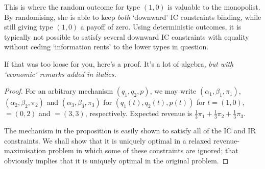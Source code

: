 This is where the random outcome for type $(1,0)$ is valuable to the monopolist.
By randomising, she is able to keep \emph{both} `downward' IC constraints binding, while still giving type $(1,0)$ a payoff of zero.
Using deterministic outcomes, it is typically not possible to satisfy several downward IC constraints with equality without ceding `information rents' to the lower types in question.

If that was too loose for you, here's a proof.
It's a lot of algebra, \emph{but with `economic' remarks added in italics.}

\begin{proof}
	For an arbitrary mechanism $(q_1,q_2,p)$,
	we may write
	$(\alpha_1,\beta_1,\pi_1)$, $(\alpha_2,\beta_2,\pi_2)$ and $(\alpha_3,\beta_3,\pi_3)$ for $( q_1(t), q_2(t), p(t) )$
	for $t = (1,0)$, $=(0,2)$ and $=(3,3)$, respectively.
	Expected revenue is $\frac{1}{3}\pi_1 + \frac{1}{3}\pi_2 + \frac{1}{3}\pi_3$.

	The mechanism in the proposition is easily shown to satisfy all of the IC and IR constraints.
	We shall show that it is uniquely optimal in a relaxed revenue-maximisation problem in which some of these constraints are ignored; that obviously implies that it is uniquely optimal in the original problem.


\end{proof}
